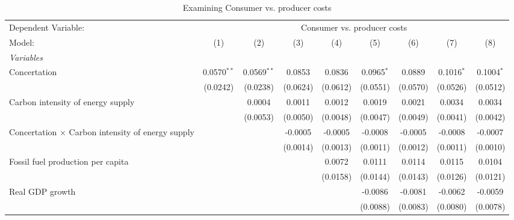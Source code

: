 
\begin{table}[htbp]
   \caption{Examining Consumer vs. producer costs}
   \centering
   \begin{tabular}{lcccccccc}
      \tabularnewline \midrule \midrule
      Dependent Variable: & \multicolumn{8}{c}{Consumer vs. producer costs}\\
      Model:                                                   & (1)           & (2)           & (3)      & (4)      & (5)          & (6)      & (7)          & (8)\\  
      \midrule
      \emph{Variables}\\
      Concertation                                             & 0.0570$^{**}$ & 0.0569$^{**}$ & 0.0853   & 0.0836   & 0.0965$^{*}$ & 0.0889   & 0.1016$^{*}$ & 0.1004$^{*}$\\   
                                                               & (0.0242)      & (0.0238)      & (0.0624) & (0.0612) & (0.0551)     & (0.0570) & (0.0526)     & (0.0512)\\   
      Carbon intensity of energy supply                        &               & 0.0004        & 0.0011   & 0.0012   & 0.0019       & 0.0021   & 0.0034       & 0.0034\\   
                                                               &               & (0.0053)      & (0.0050) & (0.0048) & (0.0047)     & (0.0049) & (0.0041)     & (0.0042)\\   
      Concertation $\times$ Carbon intensity of energy supply  &               &               & -0.0005  & -0.0005  & -0.0008      & -0.0005  & -0.0008      & -0.0007\\   
                                                               &               &               & (0.0014) & (0.0013) & (0.0011)     & (0.0012) & (0.0011)     & (0.0010)\\   
      Fossil fuel production per capita                        &               &               &          & 0.0072   & 0.0111       & 0.0114   & 0.0115       & 0.0104\\   
                                                               &               &               &          & (0.0158) & (0.0144)     & (0.0143) & (0.0126)     & (0.0121)\\   
      Real GDP growth                                          &               &               &          &          & -0.0086      & -0.0081  & -0.0062      & -0.0059\\   
                                                               &               &               &          &          & (0.0088)     & (0.0083) & (0.0080)     & (0.0078)\\   

\end{tabular}
\end{table}
